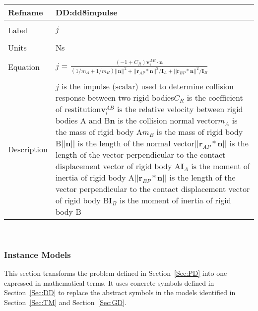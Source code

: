 \documentclass[12pt]{article}
\begin{document}
\noindent \begin{minipage}{\textwidth}
\begin{tabular}{p{} p{}}
\toprule \textbf{Refname} & \textbf{DD:dd8impulse}
\label{DD:dd8impulse}
\\ \midrule \\
Label & $j$
\\ \midrule \\
Units & Ns
\\ \midrule \\
Equation & $j$ = $\frac{(-1+C_{R})\mathbf{v}_{i}^{AB}\cdot{}\mathbf{n}}{(1/m_{A}+1/m_{B})||\mathbf{n}||^{2}+||\mathbf{r}_{AP}*\mathbf{n}||^{2}/\mathbf{I}_{A}+||\mathbf{r}_{BP}*\mathbf{n}||^{2}/\mathbf{I}_{B}}$
\\ \midrule \\
Description & $j$ is the impulse (scalar) used to determine collision response between two rigid bodies\newline$C_{R}$ is the coefficient of restitution\newline$\mathbf{v}_{i}^{AB}$ is the relative velocity between rigid bodies A and B\newline$\mathbf{n}$ is the collision normal vector\newline$m_{A}$ is the mass of rigid body A\newline$m_{B}$ is the mass of rigid body B\newline$||\mathbf{n}||$ is the length of the normal vector\newline$||\mathbf{r}_{AP}*\mathbf{n}||$ is the length of the vector perpendicular to the contact displacement vector of rigid body A\newline$\mathbf{I}_{A}$ is the moment of inertia of rigid body A\newline$||\mathbf{r}_{BP}*\mathbf{n}||$ is the length of the vector perpendicular to the contact displacement vector of rigid body B\newline$\mathbf{I}_{B}$ is the moment of inertia of rigid body B
\\ \bottomrule \end{tabular}
\end{minipage}\\
\subsubsection{Instance Models}
\label{Sec:IM}
This section transforms the problem defined in Section~\ref{Sec:PD} into one expressed in mathematical terms. It uses concrete symbols defined in Section~\ref{Sec:DD} to replace the abstract symbols in the models identified in Section~\ref{Sec:TM} and Section~\ref{Sec:GD}.
\end{document}
